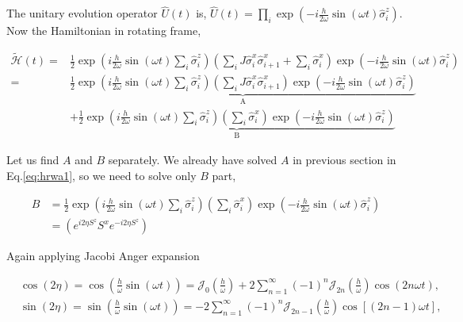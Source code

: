 \documentclass[a4paper,11pt]{article}
\begin{document}
The unitary evolution operator $\hat{U}(t)$ is, $\hat{U}(t)=\prod_{i} \exp \left(-i \frac{h}{2 \omega} \sin (\omega t) \hat{\sigma}_{i}^{z}\right)$. Now the Hamiltonian in rotating frame,

\begin{align}
\tilde{\mathcal{H}}(t)= & \frac{1}{2} \exp \left(i \frac{h}{2 \omega} \sin (\omega t) \sum_{i} \hat{\sigma}_{i}^{z}\right)\left(\sum_{i} J \hat{\sigma}_{i}^{x} \hat{\sigma}_{i+1}^{x}+\sum_{i} \hat{\sigma}_{i}^{x}\right) \exp \left(-i \frac{h}{2 \omega} \sin (\omega t) \hat{\sigma}_{i}^{z}\right) \nonumber\\
= & \underbrace{\frac{1}{2} \exp \left(i \frac{h}{2 \omega} \sin (\omega t) \sum_{i} \hat{\sigma}_{i}^{z}\right)\left(\sum_{i} J \hat{\sigma}_{i}^{x} \hat{\sigma}_{i+1}^{x}\right) \exp \left(-i \frac{h}{2 \omega} \sin (\omega t) \hat{\sigma}_{i}^{z}\right)}_{\mathrm{A}} \nonumber\\
& +\underbrace{\frac{1}{2} \exp \left(i \frac{h}{2 \omega} \sin (\omega t) \sum_{i} \hat{\sigma}_{i}^{z}\right)\left(\sum_{i} \hat{\sigma}_{i}^{x}\right) \exp \left(-i \frac{h}{2 \omega} \sin (\omega t) \hat{\sigma}_{i}^{z}\right)}_{\mathrm{B}}
\end{align}

Let us find $A$ and $B$ separately. We already have solved $A$ in previous section in Eq.\eqref{eq:hrwa1}, so we need to solve only $B$ part,


\begin{align*}
B & =\frac{1}{2} \exp \left(i \frac{h}{2 \omega} \sin (\omega t) \sum_{i} \hat{\sigma}_{i}^{z}\right)\left(\sum_{i} \hat{\sigma}_{i}^{x}\right) \exp \left(-i \frac{h}{2 \omega} \sin (\omega t) \hat{\sigma}_{i}^{z}\right) \\
& =\left(e^{i 2 \eta S^{z}} S^{x} e^{-i 2 \eta S^{z}}\right)
\end{align*}

Again applying Jacobi Anger expansion

\begin{align*}
& \cos (2 \eta)=\cos \left(\frac{h}{\omega} \sin (\omega t)\right)=\mathcal{J}_{0}\left(\frac{h}{\omega}\right)+2 \sum_{n=1}^{\infty}(-1)^{n} \mathcal{J}_{2 n}\left(\frac{h}{\omega}\right) \cos (2 n \omega t), \\
& \sin (2 \eta)=\sin \left(\frac{h}{\omega} \sin (\omega t)\right)=-2 \sum_{n=1}^{\infty}(-1)^{n} \mathcal{J}_{2 n-1}\left(\frac{h}{\omega}\right) \cos [(2 n-1) \omega t],
\end{align*}
\end{document}
